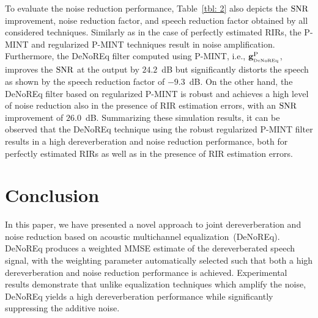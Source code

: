 \documentclass{article}
\begin{document}
To evaluate the noise reduction performance, Table~\ref{tbl: 2} also depicts the $\rm SNR$ improvement, noise reduction factor, and speech reduction factor obtained by all considered techniques.
Similarly as in the case of perfectly estimated RIRs, the P-MINT and regularized P-MINT techniques result in noise amplification.
Furthermore, the DeNoREq filter computed using P-MINT, i.e., $\mathbf{g}_{_{\rm DeNoREq}}^{\rm P}$, improves the ${\rm SNR}$ at the output by $24.2$~dB but significantly distorts the speech as shown by the speech reduction factor of $-9.3$~dB.
On the other hand, the DeNoREq filter based on regularized P-MINT is robust and achieves a high level of noise reduction also in the presence of RIR estimation errors, with an $\rm SNR$ improvement of $26.0$~dB.
Summarizing these simulation results, it can be observed that the DeNoREq technique using the robust regularized P-MINT filter results in a high dereverberation and noise reduction performance, both for perfectly estimated RIRs as well as in the presence of RIR estimation errors.

\section{Conclusion}
In this paper, we have presented a novel approach to joint dereverberation and noise reduction based on acoustic multichannel equalization~(DeNoREq).
DeNoREq produces a weighted MMSE estimate of the dereverberated speech signal, with the weighting parameter automatically selected such that both a high dereverberation and noise reduction performance is achieved.
Experimental results demonstrate that unlike equalization techniques which amplify the noise, DeNoREq yields a high dereverberation performance while significantly suppressing the additive noise.



\end{document}

